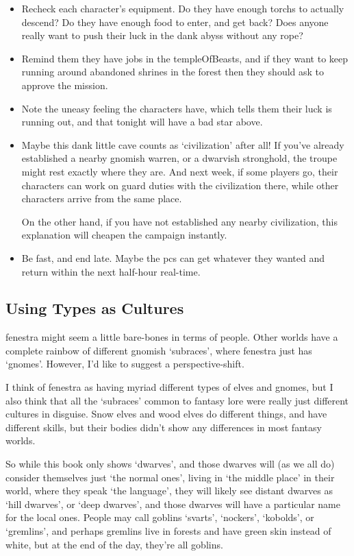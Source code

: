 \begin{multicols}{2}
\begin{itemize}
  \item
  Recheck each character's equipment.
  Do they have enough \glspl{torch} to actually descend?
  Do they have enough food to enter, and get back?
  Does anyone really want to push their luck in the dank abyss without any rope?
  \item
  Remind them they have jobs in the \gls{templeOfBeasts}, and if they want to keep running around abandoned shrines in the forest then they should ask  to approve the mission.
  \item
  Note the uneasy feeling the characters have, which tells them their luck is running out, and that tonight will have a bad star above.
  \item
  Maybe this dank little cave counts as `civilization' after all!
  If you've already established a nearby gnomish warren, or a dwarvish stronghold, the troupe might rest exactly where they are.
  And next week, if some players go, their characters can work on \gls{guard} duties with the civilization there, while other characters arrive from the same place.

  On the other hand, if you have not established any nearby civilization, this explanation will cheapen the \gls{campaign} instantly.
  \item
  Be fast, and end late.
  Maybe the \glspl{pc} can get whatever they wanted and return within the next half-hour real-time.
\end{itemize}

\subsection{Using Types as Cultures}

\Gls{fenestra} might seem a little bare-bones in terms of people.
Other worlds have a complete rainbow of different gnomish `subraces', where \gls{fenestra} just has `gnomes'.
However, I'd like to suggest a perspective-shift.

I think of \gls{fenestra} as having myriad different types of elves and gnomes, but I also think that all the `subraces' common to fantasy lore were really just different cultures in disguise.
Snow elves and wood elves do different things, and have different skills, but their bodies didn't show any differences in most fantasy worlds.

So while this book only shows `dwarves', and those dwarves will (as we all do) consider themselves just `the normal ones', living in `the middle place' in their world, where they speak `the language', they will likely see distant dwarves as `hill dwarves', or `deep dwarves', and those dwarves will have a particular name for the local ones.
People may call goblins `svarts', `nockers', `kobolds', or `gremlins', and perhaps gremlins live in forests and have green skin instead of white, but at the end of the day, they're all goblins.


\end{multicols}
